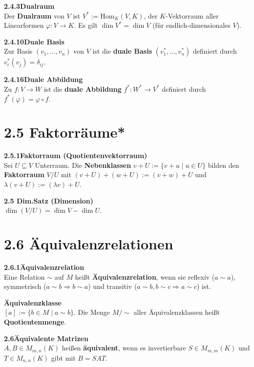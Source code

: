 \documentclass[a4paper,12pt]{article}
\newcommand{\gentry}[3]{%
  \noindent\textbf{#1\quad #2}\nopagebreak\\[0.2em]
  #3\par\smallskip
}
\begin{document}
\gentry{2.4.3}{Dualraum}{%
  Der \textbf{Dualraum} von $V$ ist $V^* := \mathrm{Hom}_K(V,K)$, der $K$-Vektorraum aller Linearformen $\varphi: V \to K$.
  Es gilt $\dim V^* = \dim V$ (für endlich-dimensionales $V$).
}

\gentry{2.4.10}{Duale Basis}{%
  Zur Basis $(v_1,\ldots,v_n)$ von $V$ ist die \textbf{duale Basis} $(v_1^*,\ldots,v_n^*)$ definiert durch $v_i^*(v_j) = \delta_{ij}$.
}

\gentry{2.4.16}{Duale Abbildung}{%
  Zu $f: V \to W$ ist die \textbf{duale Abbildung} $f^*: W^* \to V^*$ definiert durch $f^*(\varphi) = \varphi \circ f$.
}

\section*{2.5 \quad Faktorräume*}

\gentry{2.5.1}{Faktorraum (Quotientenvektorraum)}{%
  Sei $U \subseteq V$ Unterraum. Die \textbf{Nebenklassen} $v + U := \{v + u \mid u \in U\}$ bilden den \textbf{Faktorraum} $V/U$ mit $(v+U)+(w+U):=(v+w)+U$ und $\lambda(v+U):=(\lambda v)+U$.
}

\gentry{2.5 Dim.}{Satz (Dimension)}{%
  $\dim(V/U) = \dim V - \dim U$.
}

\section*{2.6 \quad Äquivalenzrelationen}

\gentry{2.6.1}{Äquivalenzrelation}{%
  Eine Relation ${\sim}$ auf $M$ heißt \textbf{Äquivalenzrelation}, wenn sie reflexiv ($a \sim a$), symmetrisch ($a \sim b \Rightarrow b \sim a$) und transitiv ($a \sim b, b \sim c \Rightarrow a \sim c$) ist.
}

\gentry{}{Äquivalenzklasse}{%
  $[a] := \{b \in M \mid a \sim b\}$. Die Menge $M/{\sim}$ aller Äquivalenzklassen heißt \textbf{Quotientenmenge}.
}

\gentry{2.6}{Äquivalente Matrizen}{%
  $A, B \in M_{m,n}(K)$ heißen \textbf{äquivalent}, wenn es invertierbare $S \in M_{m,m}(K)$ und $T \in M_{n,n}(K)$ gibt mit $B = SAT$.
}
\end{document}
